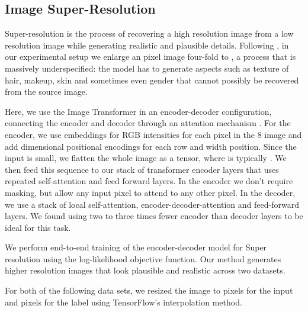 \documentclass{article}
\begin{document}
\subsection{Image Super-Resolution}\label{sec:super-res}



Super-resolution is the process of recovering a high resolution image from a low resolution image while generating realistic and plausible details. Following \citep{PixelRecursiveSuperResolution}, in our experimental setup we enlarge an  pixel image four-fold to , a process that is massively underspecified: the model has to generate aspects such as texture of hair, makeup, skin and sometimes even gender that cannot possibly be recovered from the source image.

Here, we use the Image Transformer in an encoder-decoder configuration, connecting the encoder and decoder through an attention mechanism \citep{aiayn}. For the encoder, we use embeddings for RGB intensities for each pixel in the 8 image and add  dimensional positional encodings for each row and width position. Since the input is small, we flatten the whole image as a  tensor, where  is typically . We then feed this sequence to our stack of transformer encoder layers that uses repeated self-attention and feed forward layers. In the encoder we don't require masking, but allow any input pixel to attend to any other pixel. In the decoder, we use a stack of local self-attention, encoder-decoder-attention and feed-forward layers. We found using two to three times fewer encoder than decoder layers to be ideal for this task.

We perform end-to-end training of the encoder-decoder model for Super resolution using the log-likelihood objective function. Our method generates higher resolution images that look plausible and realistic across two datasets.

For both of the following data sets, we resized the image to  pixels for the input and  pixels for the label using TensorFlow's  interpolation method.
\end{document}
